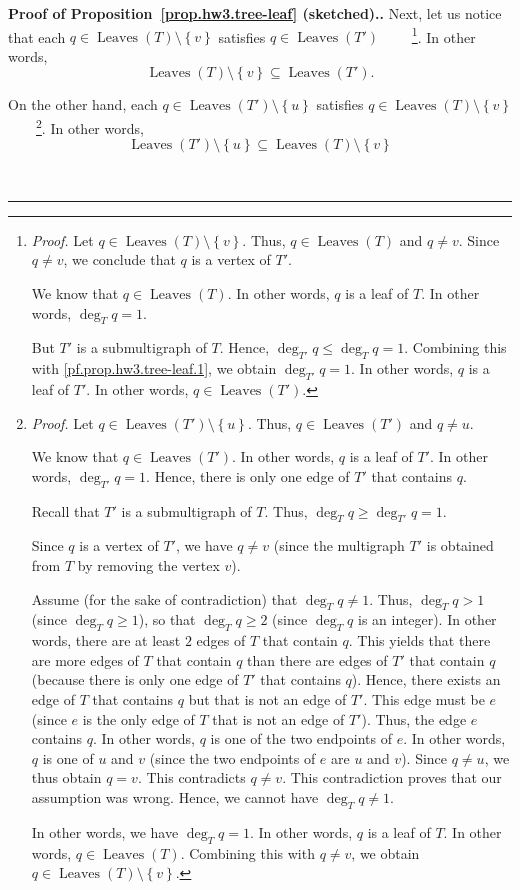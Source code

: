 \documentclass[numbers=enddot,12pt,final,onecolumn,notitlepage]{scrartcl}%
\theoremstyle{definition}
\newenvironment{proof}[1][Proof]{\noindent\textbf{#1.} }{\ \rule{0.5em}{0.5em}}
\newcommand{\set}[1]{\left\{ #1 \right\}}
\newcommand{\leaves}[1]{\operatorname{Leaves}\left( #1 \right)}
\begin{document}
{\begin{proof}[Proof of Proposition~\ref{prop.hw3.tree-leaf}
(sketched).]
Next, let us notice that
each $q \in \leaves{T} \setminus \set{v}$ satisfies
$q \in \leaves{T'}$
\ \ \ \ \footnote{\textit{Proof.}
  Let $q \in \leaves{T} \setminus \set{v}$.
  Thus, $q \in \leaves{T}$ and $q \neq v$.
  Since $q \neq v$, we conclude that $q$ is a vertex of $T'$.
  \par
  We know that $q \in \leaves{T}$.
  In other words, $q$ is a leaf of $T$.
  In other words, $\deg_T q = 1$.
  \par
  But $T'$ is a submultigraph of $T$.
  Hence, $\deg_{T'} q \leq \deg_T q = 1$.
  Combining this with \eqref{pf.prop.hw3.tree-leaf.1}, we obtain
  $\deg_{T'} q = 1$.
  In other words, $q$ is a leaf of $T'$.
  In other words, $q \in \leaves{T'}$.
}.
In other words,
\begin{equation}
\leaves{T} \setminus \set{v} \subseteq \leaves{T'} .
\label{pf.prop.hw3.tree-leaf.2}
\end{equation}

On the other hand,
each $q \in \leaves{T'} \setminus \set{u}$ satisfies
$q \in \leaves{T} \setminus \set{v}$
\ \ \ \ \footnote{\textit{Proof.}
  Let $q \in \leaves{T'} \setminus \set{u}$.
  Thus, $q \in \leaves{T'}$ and $q \neq u$.
  \par
  We know that $q \in \leaves{T'}$.
  In other words, $q$ is a leaf of $T'$.
  In other words, $\deg_{T'} q = 1$.
  Hence, there is only one edge of $T'$ that contains $q$.
  \par
  Recall that $T'$ is a submultigraph of $T$.
  Thus, $\deg_T q \geq \deg_{T'} q = 1$.
  \par
  Since $q$ is a vertex of $T'$, we have $q \neq v$ (since the
  multigraph $T'$ is obtained from $T$ by removing the vertex $v$).
  \par
  Assume (for the sake of contradiction) that $\deg_T q \neq 1$.
  Thus, $\deg_T q > 1$ (since $\deg_T q \geq 1$), so that
  $\deg_T q \geq 2$ (since $\deg_T q$ is an integer).
  In other words, there are at least $2$ edges of $T$ that contain
  $q$.
  This yields that there are more edges of $T$ that contain $q$
  than there are edges of $T'$ that contain $q$
  (because there is only one edge of $T'$ that contains $q$).
  Hence, there exists an edge of $T$ that contains $q$ but that is not
  an edge of $T'$.
  This edge must be $e$ (since $e$ is the only edge of $T$ that is not
  an edge of $T'$).
  Thus, the edge $e$ contains $q$.
  In other words, $q$ is one of the two endpoints of $e$.
  In other words, $q$ is one of $u$ and $v$ (since the two endpoints
  of $e$ are $u$ and $v$).
  Since $q \neq u$, we thus obtain $q = v$.
  This contradicts $q \neq v$.
  This contradiction proves that our assumption was wrong.
  Hence, we cannot have $\deg_T q \neq 1$.
  \par
  In other words, we have $\deg_T q = 1$.
  In other words, $q$ is a leaf of $T$.
  In other words, $q \in \leaves{T}$.
  Combining this with $q \neq v$, we obtain
  $q \in \leaves{T} \setminus \set{v}$.}.
In other words,
\begin{equation}
\leaves{T'} \setminus \set{u} \subseteq \leaves{T} \setminus \set{v}
\label{pf.prop.hw3.tree-leaf.3}
\end{equation}


\end{proof}}
\end{document}
